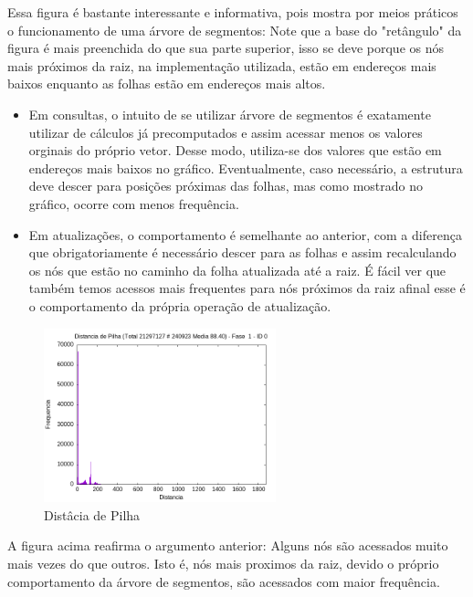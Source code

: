 \documentclass{article}
\begin{document}
Essa figura é bastante interessante e informativa, pois mostra por meios práticos o funcionamento de uma árvore de segmentos: 
Note que a base do "retângulo" da figura é mais preenchida do que sua parte superior, isso se deve porque os nós mais próximos da raiz, na implementação utilizada, estão em endereços mais baixos enquanto as folhas estão em endereços mais altos. 
\begin{itemize}
    \item Em consultas, o intuito de se utilizar árvore de segmentos é exatamente utilizar de cálculos já precomputados e assim acessar menos os valores orginais do próprio vetor. Desse modo, utiliza-se dos valores que estão em endereços mais baixos no gráfico. Eventualmente, caso necessário, a estrutura deve descer para posições próximas das folhas, mas como mostrado no gráfico, ocorre com menos frequência.
    \item Em atualizações, o comportamento é semelhante ao anterior, com a diferença que obrigatoriamente é necessário descer para as folhas e assim recalculando os nós que estão no caminho da folha atualizada até a raiz. É fácil ver que também temos acessos mais frequentes para nós próximos da raiz afinal esse é o comportamento da própria operação de atualização.
\end{itemize}

\begin{figure}[H]
    \centering
    \includegraphics[width=0.6\textwidth]{./images/registro-hist-1-0.png}
    \caption{Distâcia de Pilha}
    \label{fig:ac02}
\end{figure}

A figura acima reafirma o argumento anterior: Alguns nós são acessados muito mais vezes do que outros. Isto é, nós mais proximos da raiz, devido o próprio comportamento da árvore de segmentos, são acessados com maior frequência.
\end{document}
